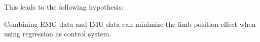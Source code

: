 This leads to the following hypothesis:
\begin{center}
	Combining EMG data and IMU data can minimize the limb position effect when using regression as control system. 
\end{center}







  	
  	
  	
  	